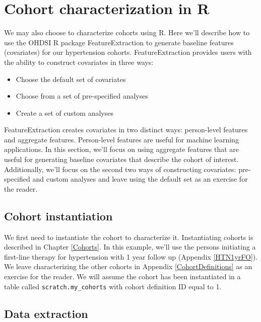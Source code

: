 \documentclass[11pt]{book}
\providecommand{\tightlist}{%
  \setlength{\itemsep}{0pt}\setlength{\parskip}{0pt}}
\theoremstyle{definition}
\theoremstyle{definition}
\theoremstyle{definition}
\theoremstyle{remark}
\begin{document}
\hypertarget{cohort-characterization-in-r}{%
\section{Cohort characterization in R}\label{cohort-characterization-in-r}}

We may also choose to characterize cohorts using R. Here we'll describe how to use the OHDSI R package FeatureExtraction to generate baseline features (covariates) for our hypertension cohorts. FeatureExtraction provides users with the ability to construct covariates in three ways: 

\begin{itemize}
\tightlist
\item
  Choose the default set of covariates
\item
  Choose from a set of pre-specified analyses
\item
  Create a set of custom analyses
\end{itemize}

FeatureExtraction creates covariates in two distinct ways: person-level features and aggregate features. Person-level features are useful for machine learning applications. In this section, we'll focus on using aggregate features that are useful for generating baseline covariates that describe the cohort of interest. Additionally, we'll focus on the second two ways of constructing covariates: pre-specified and custom analyses and leave using the default set as an exercise for the reader.

\hypertarget{cohort-instantiation}{%
\subsection{Cohort instantiation}\label{cohort-instantiation}}

We first need to instantiate the cohort to characterize it. Instantiating cohorts is described in Chapter \ref{Cohorts}. In this example, we'll use the persons initiating a first-line therapy for hypertension with 1 year follow up (Appendix \ref{HTN1yrFO}). We leave characterizing the other cohorts in Appendix \ref{CohortDefinitions} as an exercise for the reader. We will assume the cohort has been instantiated in a table called \texttt{scratch.my\_cohorts} with cohort definition ID equal to 1.

\hypertarget{data-extraction}{%
\subsection{Data extraction}\label{data-extraction}}
\end{document}
